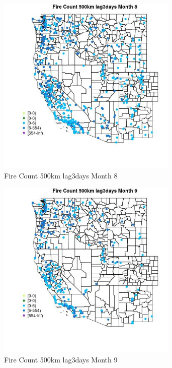 \begin{figure} 
\centering  
\includegraphics[width=0.77\textwidth]{Code_Outputs/Report_ML_input_PM25_Step4_part_e_de_duplicated_aves_compiled_2019-05-18wNAs_MapObsMo8Fire_Count_500km_lag3days.jpg} 
\caption{\label{fig:Report_ML_input_PM25_Step4_part_e_de_duplicated_aves_compiled_2019-05-18wNAsMapObsMo8Fire_Count_500km_lag3days}Fire Count 500km lag3days Month 8} 
\end{figure} 
 

\begin{figure} 
\centering  
\includegraphics[width=0.77\textwidth]{Code_Outputs/Report_ML_input_PM25_Step4_part_e_de_duplicated_aves_compiled_2019-05-18wNAs_MapObsMo9Fire_Count_500km_lag3days.jpg} 
\caption{\label{fig:Report_ML_input_PM25_Step4_part_e_de_duplicated_aves_compiled_2019-05-18wNAsMapObsMo9Fire_Count_500km_lag3days}Fire Count 500km lag3days Month 9} 
\end{figure} 
 


